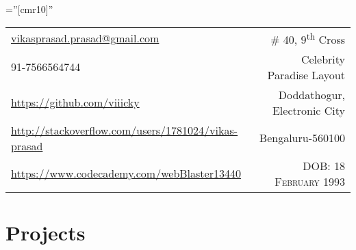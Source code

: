 \documentclass[a4paper,10pt]{article} %
\begin{document}
\pagestyle{empty} %

\font\fb=''[cmr10]'' %


\par{\par} %


\begin{tabular}{lr}
\href{mailto:vikasprasad.prasad@gmail.com}{vikasprasad.prasad@gmail.com} & \# 40, 9\textsuperscript{th} Cross \\
91-7566564744 & Celebrity Paradise Layout \\
\href{https://github.com/viiicky}{https://github.com/viiicky} & Doddathogur, Electronic City \\
\href{http://stackoverflow.com/users/1781024/vikas-prasad}{http://stackoverflow.com/users/1781024/vikas-prasad} & Bengaluru-560100 \\
\href{https://www.codecademy.com/webBlaster13440}{https://www.codecademy.com/webBlaster13440} & \textsc{DOB:} \textsc{18 February 1993}
\end{tabular}


\section{Projects}
\end{document}

